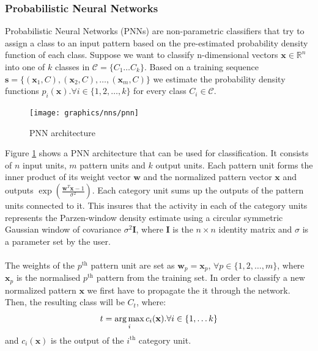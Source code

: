 	\subsubsection{Probabilistic Neural Networks}
 	Probabilistic Neural Networks (PNNs) are non-parametric classifiers that try to assign a class to an input pattern based on the pre-estimated probability density function of each class. Suppose we want to classify n-dimensional vectors $\mathbf{x} \in \mathbb{R}^n$ into one of $k$ classes in $\mathcal{C}=\{C_1\dots C_k\}$. Based on a training sequence $\mathbf{s} = \{ (\mathbf{x}_1, C), (\mathbf{x}_2, C), \dots ,(\mathbf{x}_m, C)\}$ we estimate the probability density functions $p_i(\mathbf{x}). \forall i \in \{1,2,\dots,k \}$ for every class $C_i \in \mathcal{C}$. 

  	\begin{figure}[H]
 		\centering
 		\texttt{[image: graphics/nns/pnn]}
 		\caption{PNN architecture}
 		\label{Fig 2.8}
 	\end{figure}
	 
	 Figure \ref{Fig 2.8} shows a PNN architecture that can be used for classification. It consists of $n$ input units, $m$ pattern units and $k$ output units. Each pattern unit forms the inner product of its weight vector $\mathbf{w}$ and the normalized pattern vector $\mathbf{x}$ and outputs $\exp(\frac{\mathbf{w}^T\mathbf{x} - 1}{\sigma^2})$. Each category unit sums up the outputs of the pattern units connected to it. This insures that the activity in each of the category units represents the Parzen-window density estimate using a circular symmetric Gaussian window of covariance $\sigma^2\mathbf{I}$, where $\mathbf{I}$ is the $n\times n$ identity matrix and $\sigma$ is a parameter set by the user.
     \\ \\ 
	 The weights of the $p^\text{th}$ pattern unit are set as $\mathbf{w}_p = \mathbf{x}_p$, $\forall p \in \{ 1,2,\dots ,m \}$, where $\mathbf{x}_p$ is the normalised $p^\text{th}$ pattern from the training set. In order to classify a new normalized pattern $\mathbf{x}$ we first have to propagate the it through the network. Then, the resulting class will be $C_t$, where:
	 \begin{equation}
		 t = \operatorname*{arg\,max}_i c_i(\mathbf{x}). \forall i \in \{1,\dots k\}
	 \end{equation}
	 and $c_i(\mathbf{x})$ is the output of the $i^\text{th}$ category unit.
